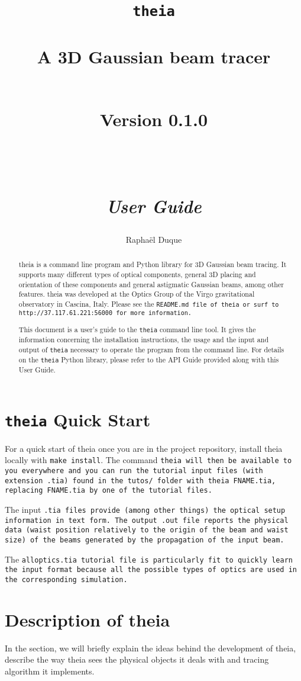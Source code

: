 \documentclass{article}
\title{\texttt{theia} \\ \quad \\A 3D Gaussian beam tracer \\ \quad \\ \begin{small} Version 0.1.0 \end{small} \\ \quad \\ \textit{User Guide}}
\author{Rapha\"el Duque}
\begin{document}
\maketitle

\begin{abstract}
theia is a command line program and Python library for 3D Gaussian beam tracing. It supports many different types of optical components, general 3D placing and orientation of these components and general astigmatic Gaussian beams, among other features. theia was developed at the Optics Group of the Virgo gravitational observatory in Cascina, Italy. Please see the \tt{README.md} file of \tt{theia} or surf to \tt{http://37.117.61.221:56000} for more information.

This document is a user's guide to the \texttt{theia} command line tool. It gives the information concerning the installation instructions, the usage and the input and output of \texttt{theia} necessary to operate the program from the command line. For details on the \texttt{theia} Python library, please refer to the API Guide provided along with this User Guide.
\end{abstract}


\tableofcontents
\newpage

\section{\texttt{theia} Quick Start}
For a quick start of theia once you are in the project repository, install theia locally with \texttt{make install}. The command \tt{theia} will then be available to you everywhere and  you can run the tutorial input files (with extension \texttt{.tia}) found in the \texttt{tutos/} folder with \texttt{theia FNAME.tia}, replacing \texttt{FNAME.tia} by one of the tutorial files.

The input \tt{.tia} files provide (among other things) the optical setup information in text form. The output \tt{.out} file reports the physical data (waist position relatively to the origin of the beam and waist size) of the beams generated by the propagation of the input beam.

The \tt{alloptics.tia} tutorial file is particularly fit to quickly learn the input format because all the possible types of optics are used in the corresponding simulation. 

\section{Description of theia}
In the section, we will briefly explain the ideas behind the development of theia, describe the way theia sees the physical objects it deals with and tracing algorithm it implements.
\end{document}
